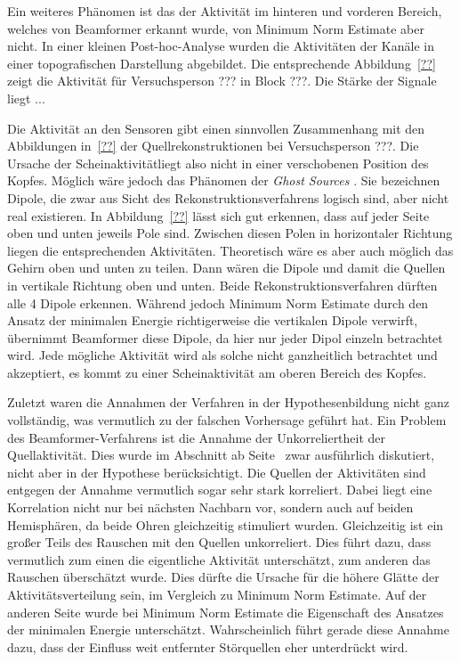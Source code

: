 \documentclass[doc,a4paper,12pt]{apa6}
\makeatletter
\DeclareRobustCommand*{\nameref}[1]{%
      \glqq{\myorg@nameref{#1}}\grqq%
    }%
\makeatother
\begin{document}
Ein weiteres Phänomen ist das der Aktivität im hinteren und vorderen Bereich, welches von Beamformer erkannt wurde, von Minimum Norm Estimate aber nicht. In einer kleinen Post-hoc-Analyse wurden die Aktivitäten der Kanäle in einer topografischen Darstellung abgebildet. Die entsprechende Abbildung~\ref{??} zeigt die Aktivität für Versuchsperson ??? in Block ???. Die Stärke der Signale liegt ...


Die Aktivität an den Sensoren gibt einen sinnvollen Zusammenhang mit den Abbildungen in~\ref{??} der Quellrekonstruktionen bei Versuchsperson ???. Die Ursache der \glqq Scheinaktivität\grqq liegt also nicht in einer verschobenen Position des Kopfes. Möglich wäre jedoch das Phänomen der \emph{Ghost Sources} \parencite{trujillo2004bayesian}. Sie bezeichnen Dipole, die zwar aus Sicht des Rekonstruktionsverfahrens logisch sind, aber nicht real existieren. In Abbildung~\ref{??} lässt sich gut erkennen, dass auf jeder Seite oben und unten jeweils Pole sind. Zwischen diesen Polen in horizontaler Richtung liegen die entsprechenden Aktivitäten. Theoretisch wäre es aber auch möglich das Gehirn oben und unten zu teilen. Dann wären die Dipole und damit die Quellen in vertikale Richtung oben und unten. Beide Rekonstruktionsverfahren dürften alle 4 Dipole erkennen. Während jedoch Minimum Norm Estimate durch den Ansatz der minimalen Energie richtigerweise die vertikalen Dipole verwirft, übernimmt Beamformer diese Dipole, da hier nur jeder Dipol einzeln betrachtet wird. Jede mögliche Aktivität wird als solche nicht ganzheitlich betrachtet und akzeptiert, es kommt zu einer Scheinaktivität am oberen Bereich des Kopfes.


Zuletzt waren die Annahmen der Verfahren in der Hypothesenbildung nicht ganz vollständig, was vermutlich zu der falschen Vorhersage geführt hat. Ein Problem des Beamformer-Verfahrens ist die Annahme der Unkorreliertheit der Quellaktivität. Dies wurde im Abschnitt \nameref{sec:beam} ab Seite~\pageref{sec:beam} zwar ausführlich diskutiert, nicht aber in der Hypothese berücksichtigt. Die Quellen der Aktivitäten sind entgegen der Annahme vermutlich sogar sehr stark korreliert. Dabei liegt eine Korrelation nicht nur bei nächsten Nachbarn vor, sondern auch auf beiden Hemisphären, da beide Ohren gleichzeitig stimuliert wurden. Gleichzeitig ist ein großer Teils des Rauschen mit den Quellen unkorreliert. Dies führt dazu, dass vermutlich zum einen die eigentliche Aktivität unterschätzt, zum anderen das Rauschen überschätzt wurde. Dies dürfte die Ursache für die höhere Glätte der Aktivitätsverteilung sein, im Vergleich zu Minimum Norm Estimate. Auf der anderen Seite wurde bei Minimum Norm Estimate die Eigenschaft des Ansatzes der minimalen Energie unterschätzt. Wahrscheinlich führt gerade diese Annahme dazu, dass der Einfluss weit entfernter Störquellen eher unterdrückt wird.
\end{document}
